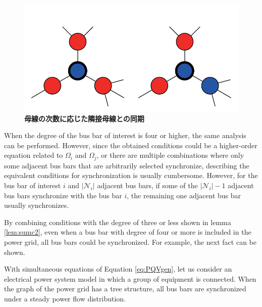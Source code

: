 \documentclass[graybox, envcountchap]{svmult}
\begin{document}
\begin{figure}[t]
{  \label{fig:N2}
  \begin{minipage}{0.48\linewidth}
    \centering
    \includegraphics[width = .85\linewidth]{figs/3degbus}
  \end{minipage}
  \medskip
  \caption{\textbf{母線の次数に応じた隣接母線との同期}}
  \label{fig:bussync}
  }
\medskip
\end{figure}
When the degree of the bus bar of interest is four or higher, the same analysis can be performed.
However, since the obtained conditions could be a higher-order equation related to $\Omega_i$ and $\Omega_j$, or there are multiple combinations where only some adjacent bus bars that are arbitrarily selected synchronize, describing the equivalent conditions for synchronization is usually cumbersome.
However, for the bus bar of interest $i$ and $|\mathcal{N}_i|$ adjacent bus bars, if some of the $|\mathcal{N}_i |-1$ adjacent bus bars synchronize with the bus bar $i$, the remaining one adjacent bus bar usually synchronizes. 

By combining conditions with the degree of three or less shown in lemma \ref{lem:sumc2}, even when a bus bar with degree of four or more is included in the power grid, all bus bars could be synchronized.
For example, the next fact can be shown.

\begin{theorem}
\label{thm:tree}
With simultaneous equations of Equation \ref{eq:PQVgen}, let us consider an electrical power system model in which a group of equipment is connected.
When the graph of the power grid has a tree structure, all bus bars are synchronized under a steady power flow distribution.
\end{theorem}
\end{document}

